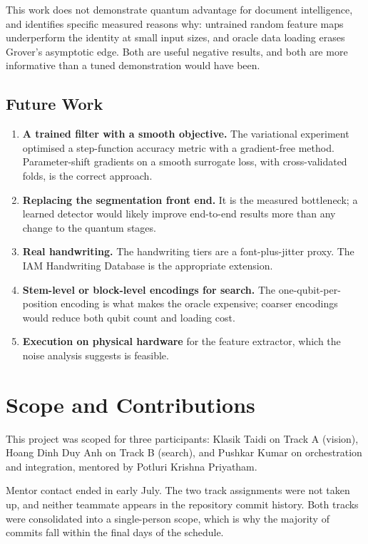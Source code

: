 \documentclass[11pt,a4paper]{article}
\begin{document}
This work does not demonstrate quantum advantage for document intelligence, and
identifies specific measured reasons why: untrained random feature maps
underperform the identity at small input sizes, and oracle data loading erases
Grover's asymptotic edge. Both are useful negative results, and both are more
informative than a tuned demonstration would have been.

\subsection{Future Work}

\begin{enumerate}
\item \textbf{A trained filter with a smooth objective.} The variational
      experiment optimised a step-function accuracy metric with a gradient-free
      method. Parameter-shift gradients on a smooth surrogate loss, with
      cross-validated folds, is the correct approach.
\item \textbf{Replacing the segmentation front end.} It is the measured
      bottleneck; a learned detector would likely improve end-to-end results more
      than any change to the quantum stages.
\item \textbf{Real handwriting.} The handwriting tiers are a font-plus-jitter
      proxy. The IAM Handwriting Database is the appropriate extension.
\item \textbf{Stem-level or block-level encodings for search.} The
      one-qubit-per-position encoding is what makes the oracle expensive;
      coarser encodings would reduce both qubit count and loading cost.
\item \textbf{Execution on physical hardware} for the feature extractor, which
      the noise analysis suggests is feasible.
\end{enumerate}

\section*{Scope and Contributions}

This project was scoped for three participants: Klasik Taidi on Track A (vision),
Hoang Dinh Duy Anh on Track B (search), and Pushkar Kumar on orchestration and
integration, mentored by Potluri Krishna Priyatham.

Mentor contact ended in early July. The two track assignments were not taken up,
and neither teammate appears in the repository commit history. Both tracks were
consolidated into a single-person scope, which is why the majority of commits
fall within the final days of the schedule.
\end{document}

